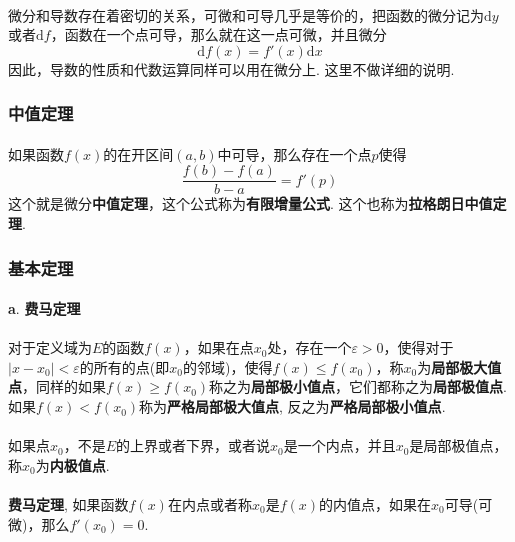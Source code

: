 \paragraph{}
微分和导数存在着密切的关系，可微和可导几乎是等价的，把函数的微分记为$\mathrm{d} y$或者$\mathrm{d} f$，函数在一个点可导，那么就在这一点可微，并且微分
$$
\mathrm{d} f(x) = f'(x) \mathrm{d} x
$$
因此，导数的性质和代数运算同样可以用在微分上. 这里不做详细的说明.


\subsubsection{中值定理}
\paragraph{}
如果函数$f(x)$的在开区间$(a, b)$中可导，那么存在一个点$p$使得
$$
\frac{f(b) - f(a)}{b - a} = f'(p)
$$
这个就是微分\textbf{中值定理}，这个公式称为\textbf{有限增量公式}. 这个也称为\textbf{拉格朗日中值定理}.

\subsubsection{基本定理}
\paragraph{}
\textbf{a}. \textbf{费马定理}

\paragraph{}
对于定义域为$E$的函数$f(x)$，如果在点$x_0$处，存在一个$\varepsilon > 0$，使得对于$|x - x_0| < \varepsilon$的所有的点(即$x_0$的邻域)，使得$f(x) \leq f(x_0)$，称$x_0$为\textbf{局部极大值点}，同样的如果$f(x) \geq f(x_0)$称之为\textbf{局部极小值点}，它们都称之为\textbf{局部极值点}.  如果$f(x) < f(x_0)$称为\textbf{严格局部极大值点}, 反之为\textbf{严格局部极小值点}. 

\paragraph{}
如果点$x_0$，不是$E$的上界或者下界，或者说$x_0$是一个内点，并且$x_0$是局部极值点，称$x_0$为\textbf{内极值点}.

\paragraph{}
\textbf{费马定理}, 如果函数$f(x)$在内点或者称$x_0$是$f(x)$的内值点，如果在$x_0$可导(可微)，那么$f'(x_0) = 0$.

